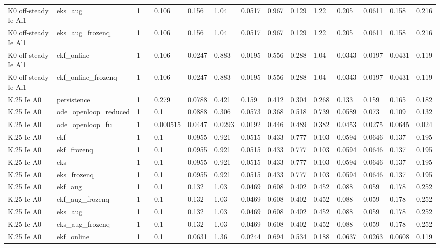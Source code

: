 \begin{table}[t]
\begin{tabular}{lllllllllllllll}
K0 off-steady Ie Al1 & eks\_aug & 1 &  & 0.106 & 0.156 & 1.04 & 0.0517 & 0.967 & 0.129 & 1.22 & 0.205 & 0.0611 & 0.158 & 0.216 \\
K0 off-steady Ie Al1 & eks\_aug\_frozenq & 1 &  & 0.106 & 0.156 & 1.04 & 0.0517 & 0.967 & 0.129 & 1.22 & 0.205 & 0.0611 & 0.158 & 0.216 \\
K0 off-steady Ie Al1 & ekf\_online & 1 &  & 0.106 & 0.0247 & 0.883 & 0.0195 & 0.556 & 0.288 & 1.04 & 0.0343 & 0.0197 & 0.0431 & 0.119 \\
K0 off-steady Ie Al1 & ekf\_online\_frozenq & 1 &  & 0.106 & 0.0247 & 0.883 & 0.0195 & 0.556 & 0.288 & 1.04 & 0.0343 & 0.0197 & 0.0431 & 0.119 \\
K.25 Ie A0 & persistence & 1 &  & 0.279 & 0.0788 & 0.421 & 0.159 & 0.412 & 0.304 & 0.268 & 0.133 & 0.159 & 0.165 & 0.182 \\
K.25 Ie A0 & ode\_openloop\_reduced & 1 &  & 0.1 & 0.0888 & 0.306 & 0.0573 & 0.368 & 0.518 & 0.739 & 0.0589 & 0.073 & 0.109 & 0.132 \\
K.25 Ie A0 & ode\_openloop\_full & 1 &  & 0.000515 & 0.0447 & 0.0293 & 0.0192 & 0.446 & 0.489 & 0.382 & 0.0453 & 0.0275 & 0.0645 & 0.024 \\
K.25 Ie A0 & ekf & 1 &  & 0.1 & 0.0955 & 0.921 & 0.0515 & 0.433 & 0.777 & 0.103 & 0.0594 & 0.0646 & 0.137 & 0.195 \\
K.25 Ie A0 & ekf\_frozenq & 1 &  & 0.1 & 0.0955 & 0.921 & 0.0515 & 0.433 & 0.777 & 0.103 & 0.0594 & 0.0646 & 0.137 & 0.195 \\
K.25 Ie A0 & eks & 1 &  & 0.1 & 0.0955 & 0.921 & 0.0515 & 0.433 & 0.777 & 0.103 & 0.0594 & 0.0646 & 0.137 & 0.195 \\
K.25 Ie A0 & eks\_frozenq & 1 &  & 0.1 & 0.0955 & 0.921 & 0.0515 & 0.433 & 0.777 & 0.103 & 0.0594 & 0.0646 & 0.137 & 0.195 \\
K.25 Ie A0 & ekf\_aug & 1 &  & 0.1 & 0.132 & 1.03 & 0.0469 & 0.608 & 0.402 & 0.452 & 0.088 & 0.059 & 0.178 & 0.252 \\
K.25 Ie A0 & ekf\_aug\_frozenq & 1 &  & 0.1 & 0.132 & 1.03 & 0.0469 & 0.608 & 0.402 & 0.452 & 0.088 & 0.059 & 0.178 & 0.252 \\
K.25 Ie A0 & eks\_aug & 1 &  & 0.1 & 0.132 & 1.03 & 0.0469 & 0.608 & 0.402 & 0.452 & 0.088 & 0.059 & 0.178 & 0.252 \\
K.25 Ie A0 & eks\_aug\_frozenq & 1 &  & 0.1 & 0.132 & 1.03 & 0.0469 & 0.608 & 0.402 & 0.452 & 0.088 & 0.059 & 0.178 & 0.252 \\
K.25 Ie A0 & ekf\_online & 1 &  & 0.1 & 0.0631 & 1.36 & 0.0244 & 0.694 & 0.534 & 0.188 & 0.0637 & 0.0263 & 0.0608 & 0.119 \\

\end{tabular}
\end{table}
